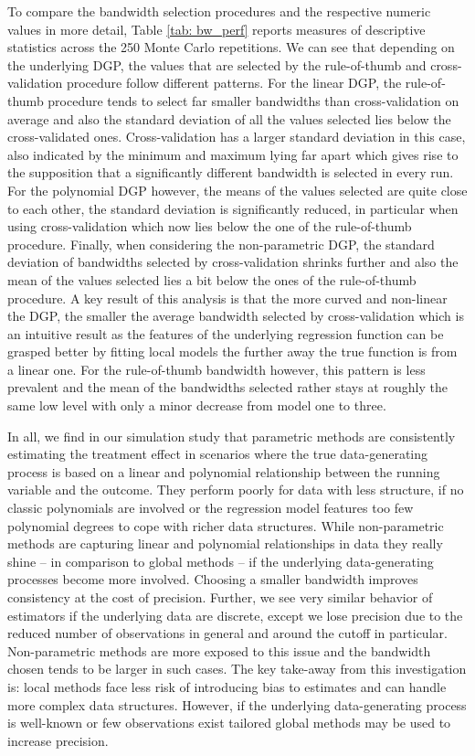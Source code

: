 \documentclass[11pt, a4paper, leqno]{article}
\numberwithin{equation}{section}
\numberwithin{figure}{section}
\numberwithin{table}{section}
\numberwithin{algorithm}{section}
\begin{document}
To compare the bandwidth selection procedures and the respective numeric values in more detail, Table \ref{tab: bw_perf} reports measures of descriptive statistics across the 250 Monte Carlo repetitions. We can see that depending on the underlying DGP, the values that are selected by the rule-of-thumb and cross-validation procedure follow different patterns. For the linear DGP, the rule-of-thumb procedure tends to select far smaller bandwidths than cross-validation on average and also the standard deviation of all the values selected lies below the cross-validated ones. Cross-validation has a larger standard deviation in this case, also indicated by the minimum and maximum lying far apart which gives rise to the supposition that a significantly different bandwidth is selected in every run. For the polynomial DGP however, the means of the values selected are quite close to each other, the standard deviation is significantly reduced, in particular when using cross-validation which now lies below the one of the rule-of-thumb procedure. Finally, when considering the non-parametric DGP, the standard deviation of bandwidths selected by cross-validation shrinks further and also the mean of the values selected lies a bit below the ones of the rule-of-thumb procedure. A key result of this analysis is that the more curved and non-linear the DGP, the smaller the average bandwidth selected by cross-validation which is an intuitive result as the features of the underlying regression function can be grasped better by fitting local models the further away the true function is from a linear one. For the rule-of-thumb bandwidth however, this pattern is less prevalent and the mean of the bandwidths selected rather stays at roughly the same low level with only a minor decrease from model one to three.


In all, we find in our simulation study that parametric methods are consistently estimating the treatment effect in scenarios where the true data-generating process is based on a linear and polynomial relationship between the running variable and the outcome. They perform poorly for data with less structure, if no classic polynomials are involved or the regression model features too few polynomial degrees to cope with richer data structures. While non-parametric methods are capturing linear and polynomial relationships in data they really shine -- in comparison to global methods -- if the underlying data-generating processes become more involved. Choosing a smaller bandwidth improves consistency at the cost of precision. Further, we see very similar behavior of estimators if the underlying data are discrete, except we lose precision due to the reduced number of observations in general and around the cutoff in particular. Non-parametric methods are more exposed to this issue and the bandwidth chosen tends to be larger in such cases. The key take-away from this investigation is: local methods face less risk of introducing bias to estimates and can handle more complex data structures. However, if the underlying data-generating process is well-known or few observations exist tailored global methods may be used to increase precision.
\end{document}
